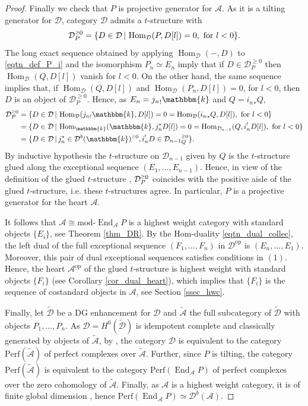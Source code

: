 \documentclass[12pt,a4paper]{amsart}
\newcommand{\aA}{{\mathcal{A}}}
\newcommand{\dD}{{\mathcal{D}}}
\newcommand{\kk}{\mathbbm{k}}
\newcommand{\gge}{\mbox{\raisebox{0.25ex}{${\scriptscriptstyle\ge}$}}}
\newcommand{\tr}{{\mbox{$t$-struc}\-tu\-r}}
\newcommand{\Hom}{\mathop{\textrm{Hom}}\nolimits}
\newcommand{\End}{\mathop{\textrm{End}}\nolimits}
\newcommand{\opp}{\mathop{\textrm{op}}\nolimits}
\newcommand{\wt}[1]{\widetilde{#1}}
\theoremstyle{definition}
\begin{document}
\begin{proof}
	Finally we check that $P$ is projective generator for $\aA$. As it is a tilting generator for $\dD$, category $\dD$ admits a \tr e with  
	\begin{align*}
	\dD^{\gge 0}_{P} = \{D\in \dD \,|\, \Hom_{\dD}(P, D[l])=0,\textrm{ for }l<0\}.
	\end{align*}
	The long exact sequence obtained by applying $\Hom_{\dD}(-,D)$ to \eqref{eqtn_def_P_i} and the isomorphism $P_n \simeq E_n$ imply that  if $D\in \dD^{\geq 0}_P$ then $\Hom_{\dD}(Q, D[l])$ vanish for $l<0$. On the other hand, the same sequence implies that, if $\Hom_{\dD}(Q, D[l])$ and $\Hom_{\dD}(P_n, D[l]) =0$, for $l<0$, then $D$ is an object of $\dD^{\geq 0 }_P$. Hence, as $E_n = {j_n}_!\kk$ and $Q = {i_n}_* Q$, 
	\begin{align*}
	\dD^{\gge 0}_P &= \{D\in \dD\,|\, \Hom_{\dD}({j_n}_!\kk, D[l]) = 0 = \Hom_{\dD}({i_n}_*Q, D[l]),  \textrm{ for }l<0\}\\
	& = \{D\in \dD\,|\, \Hom_{\kk}(\kk, j_n^*D[l]) = 0 = \Hom_{\dD_{n-1}}(Q, i_n^!D[l]),  \textrm{ for }l<0\}\\
	& = \{D\in \dD\,|\, j_n^*\in \dD^b(\kk)^{\gge 0}, i_n^!D\in {\dD_{n-1}}_Q^{\gge 0}\}.
	\end{align*}
	By inductive hypothesis the \tr e on $\dD_{n-1}$ given by $Q$ is the \tr e glued along the exceptional sequence $( E_1,\ldots, E_{n-1})$. Hence, in view of the definition of the glued \tr e \cite{BBD}, $\dD^{\gge 0}_P$ coincides with the positive aisle of the glued \tr e, i.e. these \tr es agree. 
	In particular, $P$ is a projective generator for the heart $\aA$.	
	
	It follows that $\aA \cong \textrm{mod-}\End_{\aA}P$ is a highest weight category with standard objects $\{E_i\}$, see Theorem \ref{thm_DR}. 
	By the Hom-duality \eqref{eqtn_dual_collec}, the left dual of the full exceptional sequence $(F_1,\ldots,F_n)$ in $\dD^{\opp}$ is $(E_n,\ldots, E_1)$. Moreover, this pair of dual exceptional sequences satisfies conditions in $(1)$. Hence,  the heart $\aA^{\opp}$ of the glued \tr e is highest weight with standard objects $\{F_i\}$ (see Corollary \ref{cor_dual_heart}), which implies that $\{F_i\}$ is the sequence of costandard objects in $\aA$, see Section \ref{ssec_hwc}. 
	
	Finally, let $\wt{\dD}$ be a DG enhancement for $\dD$ and $\wt{\aA}$ the full subcategory of $\wt{\dD}$ with objects $P_1, \ldots, P_n$. As $\dD = H^0(\wt{\dD})$ is idempotent complete and classically  generated by objects of $\wt{\aA}$, by \cite[Proposition 1.16]{LunOrl}, the category $\dD$ is equivalent to the category $\textrm{Perf}(\wt{\aA})$ of perfect complexes over $\wt{\aA}$. Further, since $P$ is tilting, the category $\textrm{Perf}(\wt{\aA})$ is equivalent to the category $\textrm{Perf}(\End_{\aA}P)$  of perfect complexes over the zero cohomology of $\wt{\aA}$. Finally, as $\aA$ is a highest weight category, it is of finite global dimension \cite{CPS}, hence $\textrm{Perf}(\End_{\aA} P) \simeq \dD^b(\aA)$.
\end{proof}
\end{document}
